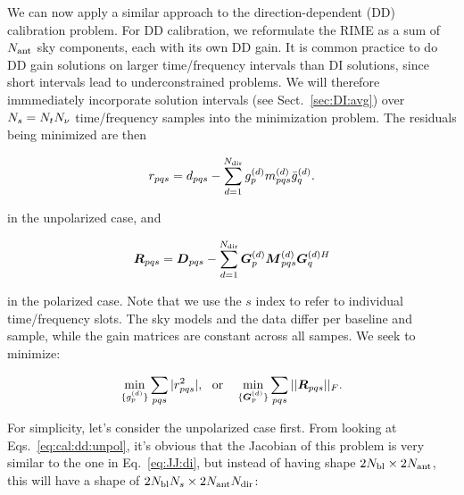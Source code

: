 \documentclass[useAMS,usenatbib]{mn2e}
\newcommand{\mat}[1]{{\bmath{#1}}}
\newcommand{\DD}{\mat{D}}
\newcommand{\MM}{\mat{M}}
\newcommand{\RR}{\mat{R}}
\newcommand{\GG}{\mat{G}}
\begin{document}
We can now apply a similar approach to the direction-dependent (DD) calibration problem. For DD calibration, we reformulate
the RIME as a sum of $N_\mathrm{ant}$ sky components, each with its own DD gain. 
It is common practice to do DD gain solutions on larger time/frequency intervals than DI 
solutions, since short intervals lead to underconstrained
problems. We will therefore immmediately incorporate solution intervals (see Sect.~\ref{sec:DI:avg}) 
over $N_s=N_t N_\nu$ time/frequency samples into the  minimization problem. The residuals being minimized
are then

\newcommand{\GGd}{\GG^{(d)}}
\newcommand{\GGdH}{\GG^{(d)H}}
\newcommand{\MMd}{\MM^{(d)}}
\newcommand{\YYd}{\YY^{(d)}}
\newcommand{\YYdH}{\YY^{(d)H}}
\newcommand{\YYc}{\YY^{(c)}}
\newcommand{\YYcH}{\YY^{(c)H}}
\newcommand{\ggd}{g^{(d)}}
\newcommand{\ggdH}{\bar{g}^{(d)}}
\newcommand{\ggc}{g^{(c)}}
\newcommand{\ggcH}{\bar{g}^{(c)}}
\newcommand{\mmc}{m^{(c)}}
\newcommand{\mmd}{m^{(d)}}
\newcommand{\mmcH}{\bar{m}^{(c)}}
\newcommand{\mmdH}{\bar{m}^{(d)}}
\newcommand{\yyd}{y^{(d)}}
\newcommand{\yydH}{\bar{y}^{(d)}}
\newcommand{\yyc}{y^{(c)}}
\newcommand{\yycH}{\bar{y}^{(c)}}

\begin{equation}
\label{eq:cal:dd:unpol}
r_{pqs} = d_{pqs} - \sum_{d=1}^{\Nd} \ggd_p \mmd_{pqs} \ggdH_q.
\end{equation}

in the unpolarized case, and

\begin{equation}
\label{eq:cal:dd:pol}
\RR_{pqs} = \DD_{pqs} - \sum_{d=1}^{\Nd} \GGd_p \MMd_{pqs} \GGdH_q
\end{equation}

in the polarized case. Note that we use the $s$ index to refer to individual time/frequency slots. The sky models and the 
data differ per baseline and sample, while the gain matrices are constant across all sampes. We seek to minimize:


\[
\min_{\{\ggd_p\}}\sum_{pqs}|r^2_{pqs}|,~~\mathrm{or}~~~\min_{\{\GGd_p\}}\sum_{pqs}||\RR_{pqs}||_F.
\]

For simplicity, let's consider the unpolarized case first. From looking at Eqs.~\ref{eq:cal:dd:unpol}, it's obvious that the 
Jacobian of this problem is very similar to the one 
in Eq.~\ref{eq:JJ:di}, but instead of having shape $2N_\mathrm{bl}\times2N_\mathrm{ant}$, this will have a 
shape of $2N_\mathrm{bl}N_s\times 2N_\mathrm{ant}N_\mathrm{dir}$:
\end{document}
